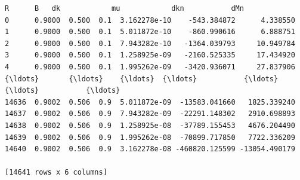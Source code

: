 \documentclass[11pt]{article}
\makeatletter
\newcommand{\boxspacing}{\kern\kvtcb@left@rule\kern\kvtcb@boxsep}
\newcommand{\prompt}[4]{
        {\ttfamily\llap{{\color{#2}[#3]:\hspace{3pt}#4}}\vspace{-\baselineskip}}
    }
\makeatother
\begin{document}
            \begin{tcolorbox}[breakable, size=fbox, boxrule=.5pt, pad at break*=1mm, opacityfill=0]
\prompt{Out}{outcolor}{27}{\boxspacing}
\begin{Verbatim}[commandchars=\\\{\}]
            R      B   dk            mu            dkn           dMn
0      0.9000  0.500  0.1  3.162278e-10    -543.384872      4.338550
1      0.9000  0.500  0.1  5.011872e-10    -860.990616      6.888751
2      0.9000  0.500  0.1  7.943282e-10   -1364.039793     10.949784
3      0.9000  0.500  0.1  1.258925e-09   -2160.525335     17.434920
4      0.9000  0.500  0.1  1.995262e-09   -3420.936071     27.837906
{\ldots}       {\ldots}    {\ldots}  {\ldots}           {\ldots}            {\ldots}           {\ldots}
14636  0.9002  0.506  0.9  5.011872e-09  -13583.041660   1825.339240
14637  0.9002  0.506  0.9  7.943282e-09  -22291.148302   2910.698893
14638  0.9002  0.506  0.9  1.258925e-08  -37789.155453   4676.204490
14639  0.9002  0.506  0.9  1.995262e-08  -70899.717850   7722.336209
14640  0.9002  0.506  0.9  3.162278e-08 -460820.125599 -13054.490179

[14641 rows x 6 columns]
\end{Verbatim}
\end{tcolorbox}
        
\end{document}
